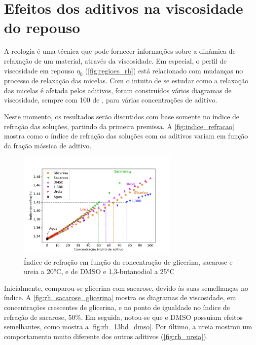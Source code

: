		\section{Efeitos dos aditivos na viscosidade do repouso} 
			\label{sec:efeito_aditivos_viscosidade}  
			A reologia é uma técnica que pode fornecer informações sobre a dinâmica de relaxação de um material, através da viscosidade. Em especial, o perfil de viscosidade em repouso \(\eta_0\) (\autoref{fig:regioes_rh}) está relacionado com mudanças no processo de relaxação das micelas. Com o intuito de se estudar como a relaxação das micelas é afetada pelos aditivos, foram construídos vários diagramas de viscosidade, sempre com 100 \mM{} de \CTAB, para várias concentrações de aditivo.
			
			Neste momento, os resultados serão discutidos com base somente no índice de refração das soluções, partindo da primeira premissa. A \autoref{fig:indice_refracao} mostra como o índice de refração das soluções com os aditivos variam em função da fração mássica de aditivo.
					
			\begin{figure}[h]
				\centering
				\includegraphics[width=0.7\textwidth]{imagens/propriedades/indice_refracao}
				\caption{Índice de refração  em função da concentração de glicerina, sacarose e ureia a 20°C\cite{Lide2003}, e de DMSO\cite{Lebel1962} e 1,3-butanodiol\cite{Piekarski1995} a 25°C}
				\label{fig:indice_refracao}
			\end{figure} 
	
			Inicialmente, comparou-se glicerina com sacarose, devido às suas semelhanças no índice. A \autoref{fig:rh_sacarose_glicerina} mostra os diagramas de viscosidade, em concentrações crescentes de glicerina, e no ponto de igualdade no índice de refração de sacarose, 50\%. Em seguida, notou-se que \BD{} e DMSO possuiam efeitos semelhantes, como mostra a \autoref{fig:rh_13bd_dmso}. Por último, a ureia mostrou um comportamento muito diferente dos outros aditivos (\autoref{fig:rh_ureia}).
			

